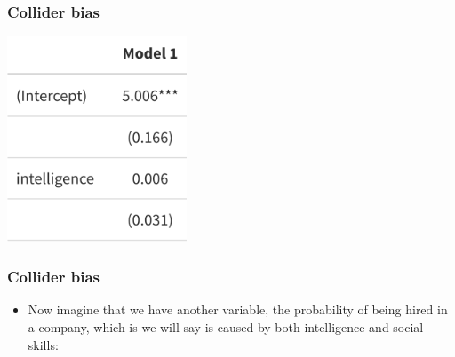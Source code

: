 \documentclass[aspectratio=43]{beamer}
\begin{document}
\begin{frame}
\frametitle{Collider bias}
\centering

\includegraphics[width = 0.4\textwidth]{../img/collider_m1}

\end{frame}

\begin{frame}
\frametitle{Collider bias}
\centering

\begin{itemize}
  \item Now imagine that we have another variable, the probability of being hired in a company, which is we will say is caused by both intelligence and social skills:
\end{itemize}



\end{frame}
\end{document}

